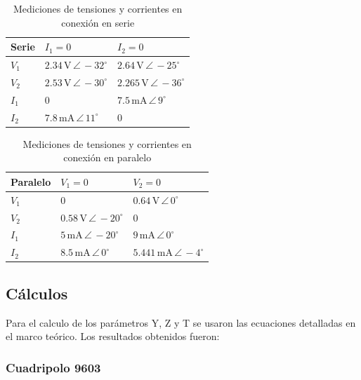 \begin{table}[H]
\centering
\begin{tabular}{|l|l|l|}
\hline
\textbf{Serie} & $I_1 = 0$ & $I_2 = 0$ \\ \hline
$V_1$ & $2.34\,\mathrm{V}\,\angle\,-32^\circ$ & $2.64\,\mathrm{V}\,\angle\,-25^\circ$ \\ \hline
$V_2$ & $2.53\,\mathrm{V}\,\angle\,-30^\circ$ & $2.265\,\mathrm{V}\,\angle\,-36^\circ$ \\ \hline
$I_1$ & $0$ & $7.5\,\mathrm{mA}\,\angle\,9^\circ$ \\ \hline
$I_2$ & $7.8\,\mathrm{mA}\,\angle\,11^\circ$ & $0$ \\ \hline
\end{tabular}
\caption{Mediciones de tensiones y corrientes en conexión en serie}
\label{tab:corrientes_tensiones_serie}
\end{table}

\begin{table}[H]
\centering
\begin{tabular}{|l|l|l|}
\hline
\textbf{Paralelo} & $V_1 = 0$ & $V_2 = 0$ \\ \hline
$V_1$ & $0$ & $0.64\,\mathrm{V}\,\angle\,0^\circ$ \\ \hline
$V_2$ & $0.58\,\mathrm{V}\,\angle\,-20^\circ$ & $0$ \\ \hline
$I_1$ & $5\,\mathrm{mA}\,\angle\,-20^\circ$ & $9\,\mathrm{mA}\,\angle\,0^\circ$ \\ \hline
$I_2$ & $8.5\,\mathrm{mA}\,\angle\,0^\circ$ & $5.441\,\mathrm{mA}\,\angle\,-4^\circ$ \\ \hline
\end{tabular}
\caption{Mediciones de tensiones y corrientes en conexión en paralelo}
\label{tab:corrientes_tensiones_paralelo}
\end{table}


     
    \subsection{Cálculos}

	Para el calculo de los parámetros Y, Z y T se usaron las ecuaciones detalladas en el marco teórico. Los resultados obtenidos fueron:
	
	\subsubsection*{Cuadripolo 9603}
	
